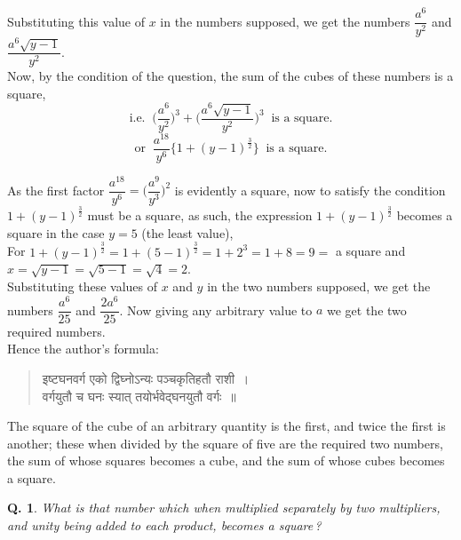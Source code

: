 \documentclass[11pt, openany]{book}
\newtheorem{question}{Q.}
\begin{document}
 Substituting this value of $x$ in the numbers supposed, we 
get the numbers $\dfrac{a^{6}}{y^{2}}$ and $\dfrac{a^{6}\sqrt{y - 1}}{y^{2}}$.\\

\vspace{-1mm}
 Now, by the condition of the question, the sum of the 
cubes of these numbers is a square, 
\begin{equation*}
 \text{i.e.}\;\; \bigg(\dfrac{a^{6}}{y^{2}}\bigg)^{3} + \bigg(\dfrac{a^{6}\sqrt{y - 1}}{y^{2}}\bigg)^{3}\;\; \text{is a square.}
\end{equation*}
\begin{equation*}
    \text{or}\;\; \dfrac{a^{18}}{y^{6}}\bigg\{1 + (y - 1)^{\frac{3}{2}}\bigg\}\;\; \text{is a square.}
\end{equation*}
 
 As the first factor $\dfrac{a^{18}}{y^{6}} = \bigg(\dfrac{a^{9}}{y^{3}}\bigg)^{2}$ is
evidently a square, 
now to satisfy the condition $1+(y - 1)^{\frac{3}{2}}$ must be a square, as
such, the expression $1+(y - 1)^{\frac{3}{2}}$ becomes a square in the case 
$y = 5$ (the least value), \\

\vspace{-2mm}
 For $1+(y - 1)^{\frac{3}{2}} = 1+(5 - 1)^{\frac{3}{2}} = 1 + 2^3 = 1 + 8 = 9 =$ a square 
and $x = \sqrt{y - 1} = \sqrt{5 - 1} = \sqrt{4} = 2.$ \\

\vspace{-2mm}
 Substituting these values of $x$ and $y$ in the two numbers 
supposed, we get the numbers $\dfrac{a^{6}}{25}$ and $\dfrac{2a^{6}}{25}$. Now giving
any
arbitrary value to $a$ we get the two required numbers. \\

\vspace{-2mm}
 Hence the author's formula:\textemdash\ 
\begin{quote}
    \qt 
    इष्टघनवर्ग एको द्विघ्नोऽन्यः पञ्चकृतिहतौ राशी~। \\
 वर्गयुतौ च घनः स्यात् तयोर्भवेद्घनयुतौ वर्गः~॥~
\end{quote}

 The square of the cube of an arbitrary quantity is the first, 
and twice the first is another; these when divided by the 
square of five are the required two numbers, the sum of whose 
\newpage
\noindent squares becomes a cube, and the sum of whose cubes becomes 
a square. 
\begin{question}
  What is that number which when multiplied separately by two multipliers, and unity being added to each
product, becomes a square\,? 
\end{question} 
\end{document}
